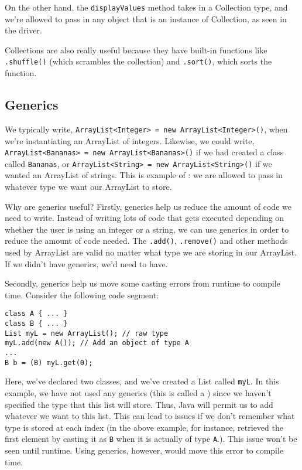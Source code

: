 On the other hand, the \verb!displayValues! method takes in a Collection type, and we're allowed to pass in any object that is an instance of Collection, as seen in the driver. 


Collections are also really useful because they have built-in functions like \verb!.shuffle()! (which scrambles the collection) and \verb!.sort()!, which sorts the function. 

\subsection{Generics}

We typically write, \verb!ArrayList<Integer> = new ArrayList<Integer>()!, when we're instantiating an ArrayList of integers. Likewise, we could write, \verb!ArrayList<Bananas> = new ArrayList<Bananas>()! if we had created a class called \verb!Bananas!, or \verb!ArrayList<String> = new ArrayList<String>()! if we wanted an ArrayList of strings. This is example of : we are allowed to pass in whatever type we want our ArrayList to store. 


Why are generics useful? Firstly, generics help us reduce the amount of code we need to write. Instead of writing lots of code that gets executed depending on whether the user is using an integer or a string, we can use generics in order to reduce the amount of code needed. The \verb!.add()!, \verb!.remove()! and other methods used by ArrayList are valid no matter what type we are storing in our ArrayList. If we didn't have generics, we'd need to have.

Secondly, generics help us move some casting errors from runtime to compile time. Consider the following code segment:

\begin{lstlisting}
class A { ... }
class B { ... }
List myL = new ArrayList(); // raw type
myL.add(new A()); // Add an object of type A
...
B b = (B) myL.get(0);
\end{lstlisting}

Here, we've declared two classes, and we've created a List called \verb!myL!. In this example, we have not used any generics (this is called a ) since we haven't specified the type that this list will store. Thus, Java will permit us to add whatever we want to this list. This can lead to issues if we don't remember what type is stored at each index (in the above example, for instance, retrieved the first element by casting it as \verb!B! when it is actually of type \verb!A!.). This issue won't be seen until runtime. Using generics, however, would move this error to compile time.

